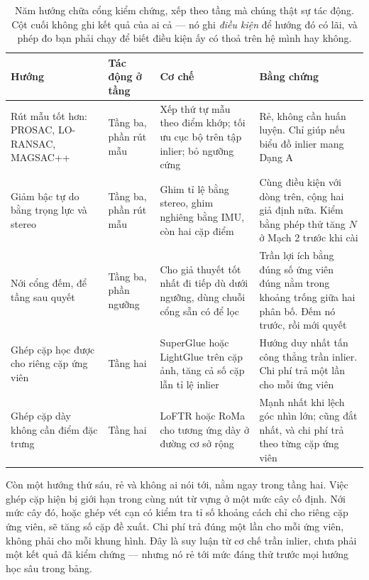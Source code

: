 \documentclass[../../deep_learning.tex]{subfiles}
\begin{document}
\begin{table}[H]\centering\footnotesize
\caption{Năm hướng chữa cổng kiểm chứng, xếp theo tầng mà chúng thật sự tác động. Cột cuối không ghi kết quả của ai cả --- nó ghi \emph{điều kiện} để hướng đó có lãi, và phép đo bạn phải chạy để biết điều kiện ấy có thoả trên hệ mình hay không.}
\label{tab:f29-chua}
\begin{tabularx}{\linewidth}{@{}L{2.6cm}L{2.4cm}YL{3.5cm}@{}}
\toprule
\textbf{Hướng} & \textbf{Tác động ở tầng} & \textbf{Cơ chế} & \textbf{Bằng chứng}\\
\midrule
Rút mẫu tốt hơn: PROSAC, LO-RANSAC, MAGSAC++ & Tầng ba, phần rút mẫu & Xếp thứ tự mẫu theo điểm khớp; tối ưu cục bộ trên tập inlier; bỏ ngưỡng cứng \cite{f29chum2005matching,f29chum2003locally,f29barath2020magsac} & Rẻ, không cần huấn luyện. Chỉ giúp nếu biểu đồ inlier mang Dạng A\\
Giảm bậc tự do bằng trọng lực và stereo & Tầng ba, phần rút mẫu & Ghim tỉ lệ bằng stereo, ghim nghiêng bằng IMU, còn hai cặp điểm & Cùng điều kiện với dòng trên, cộng hai giả định nữa. Kiểm bằng phép thử tăng \(N\) ở Mạch 2 trước khi cài\\
Nới cổng đếm, để tầng sau quyết & Tầng ba, phần ngưỡng & Cho giả thuyết tốt nhất đi tiếp dù dưới ngưỡng, dùng chuỗi cổng sẵn có để lọc & Trần lợi ích bằng đúng số ứng viên đúng nằm trong khoảng trống giữa hai phân bố. Đếm nó trước, rồi mới quyết\\
Ghép cặp học được cho riêng cặp ứng viên & Tầng hai & SuperGlue hoặc LightGlue trên cặp ảnh, tăng cả số cặp lẫn tỉ lệ inlier \cite{f29sarlin2020superglue,f29lindenberger2023lightglue} & Hướng duy nhất tấn công thẳng trần inlier. Chi phí trả một lần cho mỗi ứng viên\\
Ghép cặp dày không cần điểm đặc trưng & Tầng hai & LoFTR hoặc RoMa cho tương ứng dày ở đường cơ sở rộng \cite{f29sun2021loftr,f29edstedt2024roma} & Mạnh nhất khi lệch góc nhìn lớn; cũng đắt nhất, và chi phí trả theo từng cặp ứng viên\\
\bottomrule
\end{tabularx}
\end{table}

Còn một hướng thứ sáu, rẻ và không ai nói tới, nằm ngay trong tầng hai. Việc ghép cặp hiện bị giới hạn trong cùng nút từ vựng ở một mức cây cố định. Nới mức cây đó, hoặc ghép vét cạn có kiểm tra tỉ số khoảng cách chỉ cho riêng cặp ứng viên, sẽ tăng số cặp đề xuất. Chi phí trả đúng một lần cho mỗi ứng viên, không phải cho mỗi khung hình. Đây là suy luận từ cơ chế trần inlier, chưa phải một kết quả đã kiểm chứng --- nhưng nó rẻ tới mức đáng thử trước mọi hướng học sâu trong bảng.
\end{document}
